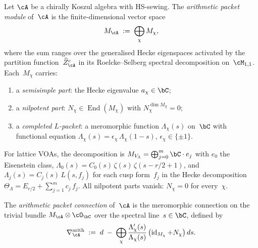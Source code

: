 \begin{definition}%
\label{def:arithmetic-packet-module}%
%
Let $\cA$ be a chirally Koszul algebra with HS-sewing.
The \emph{arithmetic packet module} of~$\cA$ is the
finite-dimensional vector space
\begin{equation}\label{eq:arithmetic-packet-module}
 M_\cA \;:=\; \bigoplus_{\chi} M_\chi,
\end{equation}
where the sum ranges over the generalised Hecke eigenspaces
activated by the partition function~$\widehat{Z}^c_\cA$ in its
Roelcke--Selberg spectral decomposition on~$\cM_{1,1}$.
Each~$M_\chi$ carries:
\begin{enumerate}[label=\textup{(\roman*)}]
\item a \emph{semisimple part}: the Hecke eigenvalue
 $a_\chi \in \bC$;
\item a \emph{nilpotent part}:
 $N_\chi \in \operatorname{End}(M_\chi)$ with
 $N_\chi^{\dim M_\chi} = 0$;
\item a \emph{completed $L$-packet}: a meromorphic function
 $\Lambda_\chi(s)$ on~$\bC$
 with functional equation $\Lambda_\chi(s) =
 \epsilon_\chi\,\Lambda_\chi(1{-}s)$,
 $\epsilon_\chi \in \{\pm 1\}$.
\end{enumerate}
For lattice VOAs, the decomposition is
$M_{V_\Lambda} = \bigoplus_{j=0}^{m} \bC\cdot e_j$
with $e_0$ the Eisenstein class,
$\Lambda_0(s) = C_0(s)\,\zeta(s)\,\zeta(s{-}r/2{+}1)$, and
$\Lambda_j(s) = C_j(s)\,L(s,f_j)$ for each cusp form~$f_j$
in the Hecke decomposition
$\Theta_\Lambda = E_{r/2} + \sum_{j=1}^m c_j\,f_j$.
All nilpotent parts vanish: $N_\chi = 0$ for every~$\chi$.
\end{definition}

\begin{definition}%
\label{def:arithmetic-packet-connection}%
%
The \emph{arithmetic packet connection} of~$\cA$ is the
meromorphic connection on the trivial bundle
$M_\cA \otimes \cO_{\bC}$ over the spectral
line~$s \in \bC$, defined by
\begin{equation}\label{eq:arithmetic-packet-connection}
 \nabla_\cA^{\mathrm{arith}}
 \;:=\;
 d \;-\; \bigoplus_\chi
 \frac{\Lambda_\chi'(s)}{\Lambda_\chi(s)}\,
 \bigl(\operatorname{id}_{M_\chi} + N_\chi\bigr)\,ds.
\end{equation}
\end{definition}


